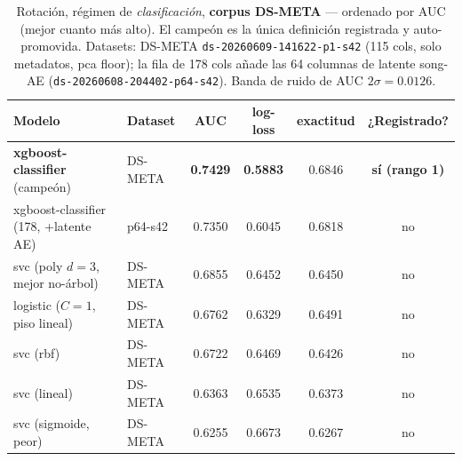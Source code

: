 \documentclass[11pt]{article}
\newcommand{\dsid}[1]{\texttt{\small #1}}
\newcommand{\best}[1]{\textbf{#1}}
\begin{document}
\begin{table}[ht]
  \centering
  \caption{Rotación, régimen de \emph{clasificación}, \textbf{corpus DS-META}
  --- ordenado por AUC (mejor cuanto más alto). El campeón es la única definición
  registrada y auto-promovida. Datasets: DS-META
  \dsid{ds-20260609-141622-p1-s42} (115 cols, solo metadatos, pca floor); la fila
  de 178 cols añade las 64 columnas de latente song-AE
  (\dsid{ds-20260608-204402-p64-s42}). Banda de ruido de AUC $2\sigma=0.0126$.}
  \label{tab:lb-auc}
  \begin{tabular}{llcccc}
    \toprule
    Modelo & Dataset & AUC & log-loss & exactitud & ¿Registrado? \\
    \midrule
    \best{xgboost-classifier} (campeón) & DS-META & \best{0.7429} & \best{0.5883} & 0.6846 & \best{sí (rango 1)} \\
    xgboost-classifier (178, +latente AE) & p64-s42 & 0.7350 & 0.6045 & 0.6818 & no \\
    svc (poly $d{=}3$, mejor no-árbol)   & DS-META & 0.6855 & 0.6452 & 0.6450 & no \\
    logistic ($C{=}1$, piso lineal)      & DS-META & 0.6762 & 0.6329 & 0.6491 & no \\
    svc (rbf)                            & DS-META & 0.6722 & 0.6469 & 0.6426 & no \\
    svc (lineal)                         & DS-META & 0.6363 & 0.6535 & 0.6373 & no \\
    svc (sigmoide, peor)                 & DS-META & 0.6255 & 0.6673 & 0.6267 & no \\
    \bottomrule
  \end{tabular}
\end{table}
\end{document}
